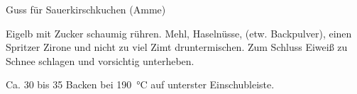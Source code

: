 \begin{MyRecipe}{Guss für Sauerkirschkuchen (Amme)}{}{}
	
	Eigelb mit Zucker schaumig rühren. Mehl, Haselnüsse, (etw. Backpulver), einen Spritzer Zirone und nicht zu viel Zimt druntermischen. Zum Schluss Eiweiß zu Schnee schlagen und vorsichtig unterheben.\par\bigskip
	
	Ca. \SI{30}{\minuteprime} bis \SI{35}{\minuteprime} Backen bei \SI{190}{\degreeCelsius} auf unterster Einschubleiste.
	
\end{MyRecipe}